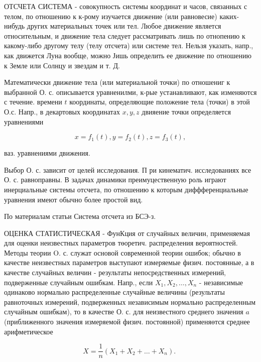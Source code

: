 \documentclass[10pt]{article}
\begin{document}
ОТСЧЕТА СИСТЕМА - совокупность системы координат и часов, связанных с телом, по отношению к к-рому изучается движение (или равновесие) каких-нибудь других материальных точек или тел. Любое движение является относительным, и движение тела следует рассматривать лишь по отнопению к какому-либо другому телу (телу отсчета) или системе тел. Нельзя указать, напр., как движется Луна вообще, можно Јишь определить ее движение по отношению к Земле или Солнцу и звездам и т. Д.



Математически движение тела (или материальной точки) по отношениг к выбранной О. с. описывается уравненилми, к-рые устанавливают, как изменяются с течение. времени $t$ координаты, определяющие положение тела (точки) в этой О.с. Напр., в декартовых координатах $x, y, z$ двияение точки определяется уравнениями



\[

x=f_{1}(t), y=f_{2}(t), z=f_{3}(t),

\]



ваз. уравнениями движения.



Выбор О. с. зависит от целей исследования. П ри кинематич. исследованиях все О. с. равноправны. В задачах динамики преимуцественную роль играют инерциальные системы отсчета, по отношению к которым диффференциальные уравнения имеют обычно более простой вид.



По материалам статьи Система отсчета из БСЭ-з.



ОЦЕНКА СТАТИСТИЧЕСКАЯ - ФунКция от случайных величин, применяемая для оценки неизвестных параметров төоретич. распределения вероятностей. Методы теории $\mathrm{O}$. с. служат основой современной теории ошибок; обычно в качестве неизвестных параметров выступают измеряемые физич. постоянные, а в качестве случайных величин - результаты непосредственных измерений, подверженные случайным ошибкам. Напр., если $X_{1}, X_{2}, \ldots, X_{n}$ - независимые одинаково нормально распределенные случайные величины (результаты равноточных измерений, подверженных независимым нормально распределенным случайным ошибкам), то в качестве О. с. для неизвестного среднего значения $a$ (приближенного значения измеряемой физич. постоянной) применяөтся среднее арифметическое



\[

X=\frac{1}{n}\left(X_{1}+X_{2}+\ldots+X_{n}\right) \text {. }

\]
\end{document}
